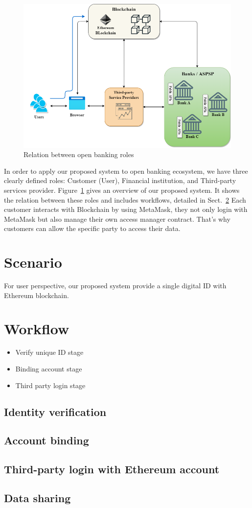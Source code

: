\newpage
\begin{figure}[hb]
    \centering
    \includegraphics[height=!,width=1\linewidth,keepaspectratio=true]{figures/system architecture-banks.png}
    \caption{{\footnotesize Relation between open banking roles}}
    \label{fig:relation}
\end{figure}
    In order to apply our proposed system to open banking ecosystem, we have three clearly defined roles: Customer (User), Financial institution, and Third-party services provider. Figure~\ref{fig:relation} gives an overview of our proposed system. It shows the relation between these roles and includes workflows, detailed in Sect.~\ref{ssec:workflow} Each customer interacts with Blockchain by using MetaMask, they not only login with MetaMask but also manage their own access manager contract. That's why customers can allow the specific party to access their data.

\section{Scenario}

    For user perspective, our proposed system provide a single digital ID with Ethereum blockchain.

\section{Workflow} \label{ssec:workflow}
\begin{itemize}
    \item Verify unique ID stage
    \item Binding account stage
    \item Third party login stage
\end{itemize}
\subsection{Identity verification}
\subsection{Account binding}
\subsection{Third-party login with Ethereum account}
\subsection{Data sharing}